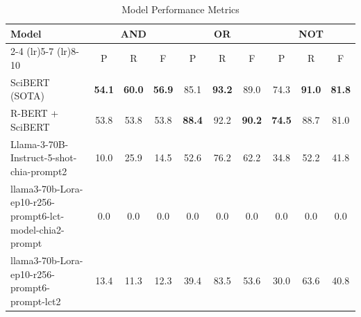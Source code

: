 \begin{table}[h]
\centering
\begin{tabular}{lccccccccc}
\toprule
Model & \multicolumn{3}{c}{AND} & \multicolumn{3}{c}{OR} & \multicolumn{3}{c}{NOT} \\
\cmidrule(lr){2-4} \cmidrule(lr){5-7} \cmidrule(lr){8-10} 
 & P & R & F & P & R & F & P & R & F \\
\midrule
SciBERT (SOTA) & \textbf{54.1} & \textbf{60.0} & \textbf{56.9} & 85.1 & \textbf{93.2} & 89.0 & 74.3 & \textbf{91.0} & \textbf{81.8} \\
R-BERT + SciBERT & 53.8 & 53.8 & 53.8 & \textbf{88.4} & 92.2 & \textbf{90.2} & \textbf{74.5} & 88.7 & 81.0 \\
Llama-3-70B-Instruct-5-shot-chia-prompt2 & 10.0 & 25.9 & 14.5 & 52.6 & 76.2 & 62.2 & 34.8 & 52.2 & 41.8 \\
llama3-70b-Lora-ep10-r256-prompt6-lct-model-chia2-prompt & 0.0 & 0.0 & 0.0 & 0.0 & 0.0 & 0.0 & 0.0 & 0.0 & 0.0 \\
llama3-70b-Lora-ep10-r256-prompt6-prompt-lct2 & 13.4 & 11.3 & 12.3 & 39.4 & 83.5 & 53.6 & 30.0 & 63.6 & 40.8 \\
\bottomrule
\end{tabular}
\caption{Model Performance Metrics}
\label{tab:model_metrics}
\end{table}
